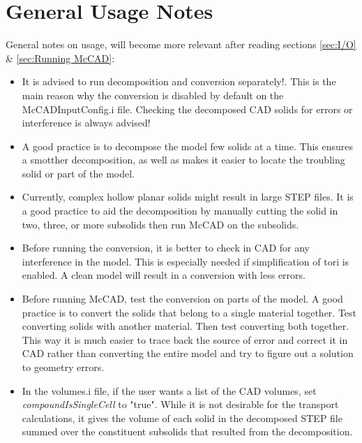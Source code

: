 \documentclass[letterpaper, 12 pt]{report}
\begin{document}
\section{General Usage Notes} \label{Known Issues}
General notes on usage, will become more relevant after reading sections \ref{sec:I/O} \& \ref{sec:Running McCAD}:
\begin{itemize}
	\item It is advised to run decomposition and conversion separately!. This is the main reason why the conversion is disabled by default on the McCADInputConfig.i file. Checking the decomposed CAD solids for errors or interference is always advised! 
	\item A good practice is to decompose the model few solids at a time. This ensures a smotther decomposition, as well as makes it easier to locate the troubling solid or part of the model.
	\item Currently, complex hollow planar solids might result in large STEP files. It is a good practice to aid the decomposition by manually cutting the solid in two, three, or more subsolids then run McCAD on the subsolids.
	\item Before running the conversion, it is better to check in CAD for any interference in the model. This is especially needed if simplification of tori is enabled. A clean model will result in a conversion with less errors.
	\item Before running McCAD, test the conversion on parts of the model. A good practice is to convert the solids that belong to a single material together. Test converting solids with another material. Then test converting both together. This way it is much easier to trace back the source of error and correct it in CAD rather than converting the entire model and try to figure out a solution to geometry errors.
	\item In the volumes.i file, if the user wants a list of the CAD volumes, set \emph{compoundIsSingleCell} to "true". While it is not desirable for the transport calculations, it gives the volume of each solid in the decomposed STEP file summed over the constituent subsolids that resulted from the decomposition.
\end{itemize}

\end{document}

